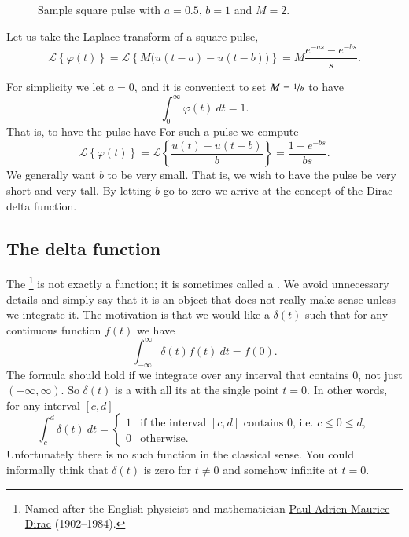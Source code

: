 \begin{figure}[h!t]
\begin{center}
\capstart
{}
\caption{Sample square pulse with $a=0.5$, $b=1$ and $M = 2$.\label{lt:sqpulse}}
\end{center}
\end{figure}

Let us take the Laplace transform of a square pulse,
\begin{equation*}
{\mathcal{L}} \left\{ \varphi(t) \right\}
=
{\mathcal{L}} \left\{ M \bigl( u(t-a) - u(t-b) \bigr)  \right\}
=
M
\frac{e^{-as} - e^{-bs}}{s} .
\end{equation*}

For simplicity we let $a=0$, and it is convenient
to set $M = \nicefrac{1}{b}$ to have
\begin{equation*}
\int_0^\infty \varphi(t) ~dt = 1 .
\end{equation*}
That is, to have the pulse have 
For such a pulse we
compute
\begin{equation*}
{\mathcal{L}} \left\{ \varphi(t) \right\}
=
{\mathcal{L}} \left\{ \frac{u(t) - u(t-b)}{b}  \right\}
=
\frac{1 - e^{-bs}}{bs} .
\end{equation*}
We generally want $b$ to be very small.  That is, we wish to have
the pulse be very short and very tall.  By letting $b$ go to zero we arrive
at the concept of the Dirac delta function.

\subsection{The delta function}

The \emph{}%
\footnote{Named after the English physicist and mathematician
\href{https://en.wikipedia.org/wiki/Paul_Dirac}{Paul Adrien Maurice Dirac}
(1902--1984).}
is not exactly a function; it is sometimes called a
\emph{}.  We
avoid unnecessary details and simply say that it is an object
that does not really make sense unless we integrate it.  The motivation is
that we would like a  $\delta(t)$
such that 
for any continuous function $f(t)$ we have
\begin{equation*}
\boxed{~~
\int_{-\infty}^\infty \delta(t) f(t) ~dt = f(0) .
~~}
\end{equation*}
The formula should hold if we integrate over any interval that contains 0,
not just $(-\infty,\infty)$.
So $\delta(t)$ is a  
with all its  at the single point $t=0$.  In other words, for any
interval $[c,d]$
\begin{equation*}
\int_c^d \delta(t) ~dt = 
\begin{cases}
1 & \text{if the interval $[c,d]$ contains 0, i.e. } c \leq 0 \leq d, \\
0 & \text{otherwise.}
\end{cases}
\end{equation*}
Unfortunately there is no such function in the classical sense.  You could
informally think that $\delta(t)$ is zero for $t\not=0$ and somehow
infinite at $t=0$.


